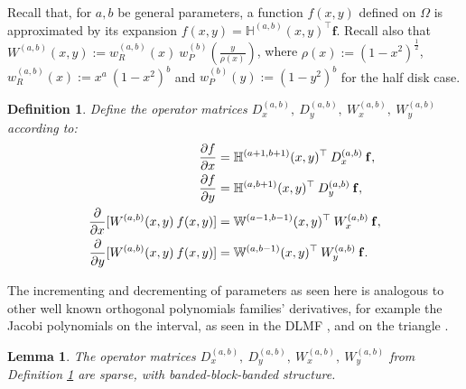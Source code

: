 \documentclass[11pt, oneside]{article}   	%
\newcommand{\half}{\frac{1}{2}}
\newcommand{\hdop}{H}
\newcommand{\bighdop}{\mathbb{\hdop}}
\newcommand{\Wab}{{W^{(a,b)}}}
\newcommand{\bighdopab}{\bighdop^{(a,b)}}
\newcommand{\genjac}{R}
\newcommand{\genjacw}{w_\genjac}
\newcommand{\bigW}{\mathbb{W}}
\newtheorem{lemma}{Lemma}
\newtheorem{definition}{Definition}
\begin{document}
Recall that, for $a, b$ be general parameters, a function $f(x,y)$ defined on $\Omega$ is approximated by its expansion $f(x,y) = \bighdopab(x,y)^\top \mathbf{f}$. Recall also that $\Wab(x,y) := \genjacw^{(a,b)}(x) \: w_P^{(b)}(\frac{y}{\rho(x)})$, where $\rho(x) := (1-x^2)^\half$, $\genjacw^{(a,b)}(x) := x^a \: (1-x^2)^b$ and $w_P^{(b)}(y) := (1-y^2)^b$ for the half disk case.

\begin{definition}\label{def:differentialoperators}
Define the operator matrices $D_x^{(a,b)}, \: D_y^{(a,b)}, \: W_x^{(a,b)}, \: W_y^{(a,b)}$ according to:
\begin{align*}
{\partial f \over \partial x}&= \bighdop^{(a+1,b+1)}(x,y)^\top \: D_x^{(a,b)} \: \mathbf{f}, \\
{\partial f \over \partial y} &= \bighdop^{(a,b+1)}(x,y)^\top \: D_y^{(a,b)} \: \mathbf{f}, \\
{\partial \over \partial x}[\Wab(x,y) \: f(x,y)] &= \bigW^{(a-1,b-1)}(x,y)^\top \: W_x^{(a,b)} \: \mathbf{f}, \\
{\partial \over \partial y}[\Wab(x,y) \: f(x,y)] &= \bigW^{(a,b-1)}(x,y)^\top \: W_y^{(a,b)} \: \mathbf{f}.
\end{align*}
\end{definition}

The incrementing and decrementing of parameters as seen here is analogous to other well known orthogonal polynomials families' derivatives, for example the Jacobi polynomials on the interval, as seen in the DLMF \cite[(18.9.3)]{DLMF}, and on the triangle \cite{olver2018recurrence}.

\begin{lemma}\label{lemma:sparsityofdifferentialoperators}
The operator matrices $D_x^{(a,b)}, \: D_y^{(a,b)}, \: W_x^{(a,b)}, \: W_y^{(a,b)}$ from Definition \ref{def:differentialoperators} are sparse, with banded-block-banded structure.
\end{lemma}
\end{document}
